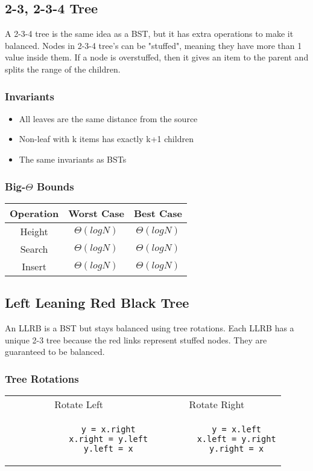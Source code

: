 \documentclass{article}
\begin{document}
\subsection{2-3, 2-3-4 Tree}
A 2-3-4 tree is the same idea as a BST, but it has extra operations to make it balanced.
Nodes in 2-3-4 tree's can be "stuffed", meaning they have more than 1 value inside them.
If a node is overstuffed, then it gives an item to the parent and splits the range of the children.
\subsubsection{Invariants}
\begin{itemize}
    \item All leaves are the same distance from the source
    \item Non-leaf with k items has exactly k+1 children
    \item The same invariants as BSTs
\end{itemize}
\subsubsection{Big-$\Theta$ Bounds}
\begin{center}
    \begin{tabular}{ c | c | c }
     Operation & Worst Case & Best Case\\
     \hline
     Height & $\Theta(log N)$ & $\Theta(log N)$ \\ 
     Search & $\Theta(log N)$ & $\Theta(log N)$ \\  
     Insert & $\Theta(log N)$ & $\Theta(log N)$  
    \end{tabular}
\end{center}
\subsection{Left Leaning Red Black Tree}
An LLRB is a BST but stays balanced using tree rotations. Each LLRB has a unique 2-3 tree because the red links represent stuffed nodes.
They are guaranteed to be balanced.
\subsubsection{Tree Rotations}
\begin{center}
    \begin{tabular}{ c c }
        Rotate Left & Rotate Right\\
        \begin{lstlisting}
            y = x.right
            x.right = y.left
            y.left = x
        \end{lstlisting} &
    \begin{lstlisting}
        y = x.left
        x.left = y.right
        y.right = x
    \end{lstlisting}
    \end{tabular}
\end{center}
\end{document}
